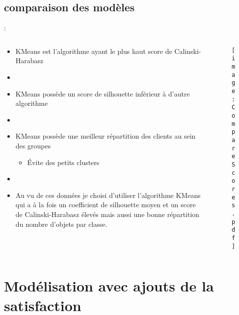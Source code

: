 \documentclass[8pt,aspectratio=169,hyperref={unicode=true}]{beamer}
\begin{document}
\subsection{comparaison des modèles}
\begin{frame}{\insertsection: \insertsubsection}
    \begin{columns}
        \begin{column}{.5\textwidth}
            \begin{itemize}
                \item KMeans est l'algorithme ayant le plus haut score de Calinski-Harabasz
                \item[]
                \item KMeans possède un score de silhouette inférieur à d'autre algorithme
                \item[]
                \item KMeans possède une meilleur répartition des clients au sein des groupes
                      \begin{itemize}
                          \item Évite des petits clusters
                      \end{itemize}
                \item[]
                \item Au vu de ces données je choisi d'utiliser l'algorithme KMeans qui a à la fois un coefficient de silhouette moyen et un score de Calinski-Harabasz élevés mais aussi une bonne répartition du nombre d'objets par classe.
            \end{itemize}
        \end{column}
        \begin{column}{.5\textwidth}
            \begin{figure}
                \texttt{[image: CompareScores.pdf]}
            \end{figure}
        \end{column}
    \end{columns}
\end{frame}

\section{Modélisation avec ajouts de la satisfaction}
\end{document}
